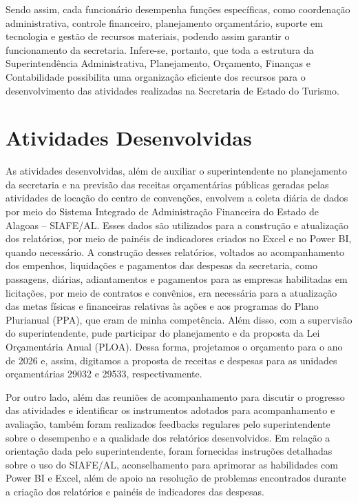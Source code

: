 \documentclass[12pt,a4paper]{article}
\begin{document}
	Sendo assim, cada funcionário desempenha funções específicas, como coordenação administrativa, controle financeiro, planejamento orçamentário, suporte em tecnologia e gestão de recursos materiais, podendo assim garantir o funcionamento da secretaria. Infere-se, portanto, que toda a estrutura da Superintendência Administrativa, Planejamento, Orçamento, Finanças e Contabilidade possibilita uma organização eficiente dos recursos para o desenvolvimento das atividades realizadas na Secretaria de Estado do Turismo.

	


	
	\section{Atividades Desenvolvidas}
	
	\hspace*{1.5cm}As atividades desenvolvidas, além de auxiliar o superintendente no planejamento da secretaria e na previsão das receitas orçamentárias públicas geradas pelas atividades de locação do centro de convenções, envolvem a coleta diária de dados por meio do Sistema Integrado de Administração Financeira do Estado de Alagoas – SIAFE/AL. Esses dados são utilizados para a construção e atualização dos relatórios, por meio de painéis de indicadores criados no Excel e no Power BI, quando necessário. A construção desses relatórios, voltados ao acompanhamento dos empenhos, liquidações e pagamentos das despesas da secretaria, como passagens, diárias, adiantamentos e pagamentos para as empresas habilitadas em licitações, por meio de contratos e convênios, era necessária para a atualização das metas físicas e financeiras relativas às ações e aos programas do Plano Plurianual (PPA), que eram de minha competência. Além disso, com a supervisão do superintendente, pude participar do planejamento e da proposta da Lei Orçamentária Anual (PLOA). Dessa forma, projetamos o orçamento para o ano de 2026 e, assim, digitamos a proposta de receitas e despesas para as unidades orçamentárias 29032 e 29533, respectivamente.
	
	Por outro lado, além das reuniões de acompanhamento para discutir o progresso das atividades e identificar os instrumentos adotados para acompanhamento e avaliação, também foram realizados feedbacks regulares pelo superintendente sobre o desempenho e a 
	qualidade dos relatórios desenvolvidos. Em relação a orientação dada pelo superintendente, foram fornecidas instruções detalhadas sobre o uso do SIAFE/AL, 
	aconselhamento para aprimorar as habilidades com Power BI e Excel, além de apoio na resolução de problemas encontrados durante a criação dos relatórios e painéis de indicadores das despesas.  
	
\end{document}
